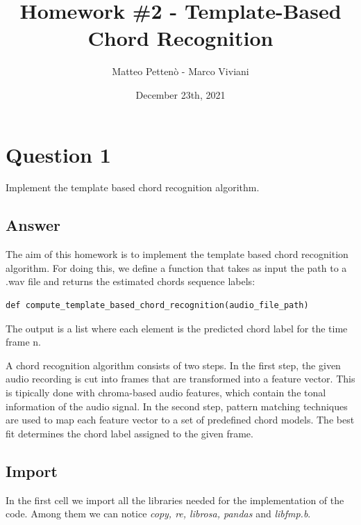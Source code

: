 \documentclass[
	12pt, %
]{fphw}
\title{Homework \#2 - Template-Based Chord Recognition} %
\author{Matteo Pettenò - Marco Viviani} %
\date{December 23th, 2021} %
\institute{Politecnico di Milano} %
\begin{document}
\maketitle %


\section*{Question 1}

\begin{problem}
	Implement the template based chord recognition algorithm.
\end{problem}

\subsection*{Answer}

The aim of this homework is to implement the template based chord recognition algorithm. For doing this, we define a function that takes as input the path to a .wav file and returns the estimated chords sequence labels:

\begin{lstlisting}
def compute_template_based_chord_recognition(audio_file_path)
\end{lstlisting}

The output is a list where each element is the predicted chord label for the time frame n.

A chord recognition algorithm consists of two steps. In the first step, the given audio recording is cut into frames that are transformed into a feature vector. This is tipically done with chroma-based audio features, which contain the tonal information of the audio signal.
In the second step, pattern matching techniques are used to map each feature vector to a set of predefined chord models. The best fit determines the chord label assigned to the given frame.

\subsection{Import}
In the first cell we import all the libraries needed for the implementation of the code. Among them we can notice \textit{copy, re, librosa, pandas} and \textit{libfmp.b}.
\end{document}

